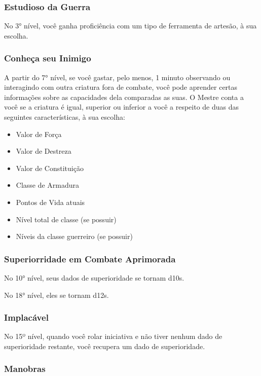 \documentclass{RPG_Adventure}[2021/10/20]
\begin{document}
\subsubsection{Estudioso da Guerra}%

No 3° nível, você ganha proficiência com um tipo de ferramenta de artesão, à sua
escolha.

\subsubsection{Conheça seu Inimigo}%

A partir do 7° nível, se você gastar, pelo menos, 1 minuto observando ou
interagindo com outra criatura fora de combate, você pode aprender certas
informações sobre as capacidades dela comparadas as suas. O Mestre conta a você
se a criatura é igual, superior ou inferior a você a respeito de duas das
seguintes características, à sua escolha:

\begin{itemize}
    \item Valor de Força
    \item Valor de Destreza
    \item Valor de Constituição
    \item Classe de Armadura
    \item Pontos de Vida atuais
    \item Nível total de classe (se possuir)
    \item Níveis da classe guerreiro (se possuir)
\end{itemize}

\subsubsection{Superiorridade em Combate Aprimorada}%

No 10° nível, seus dados de superioridade se tornam d10s.

No 18° nível, eles se tornam d12s.

\subsubsection{Implacável}%

No 15º nível, quando você rolar iniciativa e não tiver nenhum dado de
superioridade restante, você recupera um dado de superioridade.

\subsubsection{Manobras}%
\end{document}
